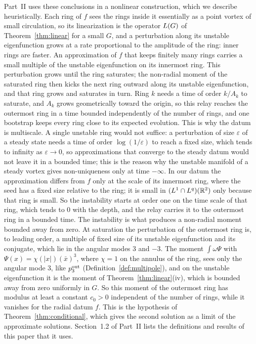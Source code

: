 Part~II uses these conclusions in a nonlinear construction, which we describe
heuristically. Each ring of $f$ sees the rings inside it essentially as a point
vortex of small circulation, so its linearization is the operator $L(G)$ of
Theorem~\ref{thm:linear} for a small $G$, and a perturbation along its unstable eigenfunction grows at a rate
proportional to the amplitude of the ring: inner rings are faster. An approximation of $f$ that keeps finitely many rings
carries a small multiple of the unstable eigenfunction on its innermost ring.
This perturbation grows until the ring saturates; the non-radial moment of the saturated ring then
kicks the next ring outward along its unstable eigenfunction, and that ring
grows and saturates in turn. Ring $k$ needs a time of order $k/A_k$ to saturate, and $A_k$ grows
geometrically toward the origin, so this relay reaches the outermost ring in a
time bounded independently of the number of rings, and one bootstrap keeps every ring close to its
expected evolution. This is why the datum is multiscale. A single unstable ring
would not suffice: a perturbation of size $\varepsilon$ of a steady state needs a
time of order $\log(1/\varepsilon)$ to reach a fixed size, which tends to infinity
as $\varepsilon\to0$, so approximations that converge to the steady datum would
not leave it in a bounded time; this is the reason why the unstable manifold of a
steady vortex gives non-uniqueness only at time $-\infty$. In our datum the
approximation differs from $f$ only at the scale of its innermost ring, where the
seed has a fixed size relative to the ring; it is small in $(L^1\cap L^q)(\mathbb{R}^2)$
only because that ring is small. So the instability starts at order one on the
time scale of that ring, which tends to $0$ with the depth, and the relay carries
it to the outermost ring in a bounded time. The instability is what produces a non-radial moment bounded
away from zero. At saturation the perturbation of the outermost ring is, to
leading order, a multiple of fixed size of its unstable eigenfunction and its
conjugate, which lie in the angular modes $3$ and $-3$. The moment
$\int\omega\Psi$ with $\Psi(x)=\chi(|x|)(\bar x)^3$, where $\chi=1$ on the annulus
of the ring, sees only the angular mode $3$, like $p^{\mathrm{out}}_3$
(Definition~\ref{def:multipole}), and on the unstable eigenfunction it is the
moment of Theorem~\ref{thm:linear}(iv), which is bounded away from zero uniformly
in $G$. So this moment of the outermost ring has modulus at least a constant
$c_0>0$ independent of the number of rings, while it vanishes for the radial datum
$f$. This is the hypothesis of Theorem~\ref{thm:conditional}, which gives the
second solution as a limit of the approximate solutions. Section~1.2 of Part~II lists the definitions and results of this paper
that it uses.

